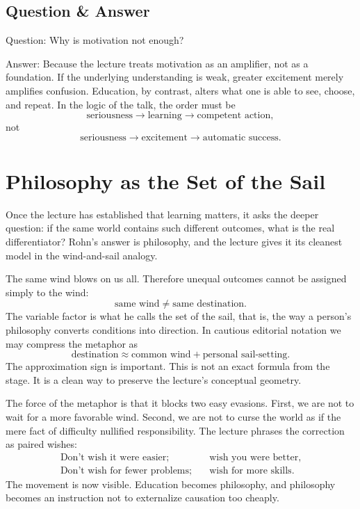 \subsection{Question \& Answer}

Question: Why is motivation not enough?

Answer: Because the lecture treats motivation as an amplifier, not as a foundation. If the underlying understanding is weak, greater excitement merely amplifies confusion. Education, by contrast, alters what one is able to see, choose, and repeat. In the logic of the talk, the order must be
\begin{equation}
\text{seriousness} \to \text{learning} \to \text{competent action},
\end{equation}
not
\begin{equation}
\text{seriousness} \to \text{excitement} \to \text{automatic success}.
\end{equation}

\section{Philosophy as the Set of the Sail}

Once the lecture has established that learning matters, it asks the deeper question: if the same world contains such different outcomes, what is the real differentiator? Rohn's answer is philosophy, and the lecture gives it its cleanest model in the wind-and-sail analogy.

The same wind blows on us all. Therefore unequal outcomes cannot be assigned simply to the wind:
\begin{equation}
\text{same wind} \neq \text{same destination}.
\end{equation}
The variable factor is what he calls the set of the sail, that is, the way a person's philosophy converts conditions into direction. In cautious editorial notation we may compress the metaphor as
\begin{equation}
\text{destination} \approx \text{common wind} + \text{personal sail-setting}.
\end{equation}
The approximation sign is important. This is not an exact formula from the stage. It is a clean way to preserve the lecture's conceptual geometry.

The force of the metaphor is that it blocks two easy evasions. First, we are not to wait for a more favorable wind. Second, we are not to curse the world as if the mere fact of difficulty nullified responsibility. The lecture phrases the correction as paired wishes:
\begin{align}
\text{Don't wish it were easier};\quad &\text{wish you were better},\\
\text{Don't wish for fewer problems};\quad &\text{wish for more skills}.
\end{align}
The movement is now visible. Education becomes philosophy, and philosophy becomes an instruction not to externalize causation too cheaply.

